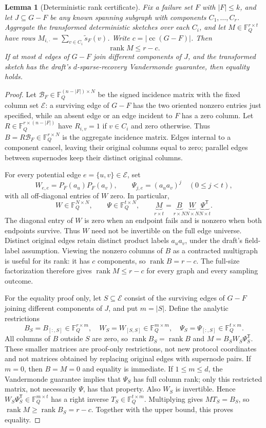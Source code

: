 \documentclass[11pt]{article}
\newtheorem{lemma}[theorem]{Lemma}
\theoremstyle{remark}\newtheorem{remark}[theorem]{Remark}
\newcommand{\F}{\mathbb F}
\newcommand{\rank}{\operatorname{rank}}
\newcommand{\cc}{\operatorname{cc}}
\begin{document}
\begin{lemma}[Deterministic rank certificate]\label{lem:rank}
Fix a failure set $F$ with $|F|\le k$, and let $J\subseteq G-F$ be any known spanning subgraph with components $C_1,\ldots,C_r$. Aggregate the transformed deterministic sketches over each $C_i$, and let $M\in\F_Q^{r\times t}$ have rows $M_{i,\cdot}=\sum_{v\in C_i}\widetilde s_F(v)$. Write $c=|\cc(G-F)|$. Then
\[
 \rank M\le r-c.
\]
If at most $d$ edges of $G-F$ join different components of $J$, and the transformed sketch has the draft's $d$-sparse-recovery Vandermonde guarantee, then equality holds.
\end{lemma}
\begin{proof}
Let $\mathcal B_F\in\F_Q^{(n-|F|)\times N}$ be the signed incidence matrix with the fixed column set $\mathcal E$: a surviving edge of $G-F$ has the two oriented nonzero entries just specified, while an absent edge or an edge incident to $F$ has a zero column. Let $R\in\F_Q^{r\times(n-|F|)}$ have $R_{i,v}=1$ if $v\in C_i$ and zero otherwise. Thus $B=R\mathcal B_F\in\F_Q^{r\times N}$ is the aggregate incidence matrix. Edges internal to a component cancel, leaving their original columns equal to zero; parallel edges between supernodes keep their distinct original columns.

For every potential edge $e=\{u,v\}\in\mathcal E$, set
\[
 W_{e,e}=P_F(a_u)P_F(a_v),\qquad
 \Psi_{j,e}=(a_ua_v)^j\quad(0\le j<t),
\]
with all off-diagonal entries of $W$ zero. In particular,
\[
 W\in\F_Q^{N\times N},\qquad
 \Psi\in\F_Q^{t\times N},\qquad
 \underbrace{M}_{r\times t}
 =\underbrace{B}_{r\times N}
  \underbrace{W}_{N\times N}
  \underbrace{\Psi^{\mathsf T}}_{N\times t}.
\]
The diagonal entry of $W$ is zero when an endpoint fails and is nonzero when both endpoints survive. Thus $W$ need not be invertible on the full edge universe. Distinct original edges retain distinct product labels $a_ua_v$, under the draft's field-label assumption. Viewing the nonzero columns of $B$ as a contracted multigraph is useful for its rank: it has $c$ components, so $\rank B=r-c$. The full-size factorization therefore gives $\rank M\le r-c$ for every graph and every sampling outcome.

For the equality proof only, let $S\subseteq\mathcal E$ consist of the surviving edges of $G-F$ joining different components of $J$, and put $m=|S|$. Define the analytic restrictions
\[
 B_S=B_{[:,S]}\in\F_Q^{r\times m},\quad
 W_S=W_{[S,S]}\in\F_Q^{m\times m},\quad
 \Psi_S=\Psi_{[:,S]}\in\F_Q^{t\times m}.
\]
All columns of $B$ outside $S$ are zero, so $\rank B_S=\rank B$ and $M=B_SW_S\Psi_S^{\mathsf T}$. These smaller matrices are proof-only restrictions, not new protocol coordinates and not matrices obtained by replacing original edges with supernode pairs. If $m=0$, then $B=M=0$ and equality is immediate. If $1\le m\le d$, the Vandermonde guarantee implies that $\Psi_S$ has full column rank; only this restricted matrix, not necessarily $\Psi$, has that property. Also $W_S$ is invertible. Hence $W_S\Psi_S^{\mathsf T}\in\F_Q^{m\times t}$ has a right inverse $T_S\in\F_Q^{t\times m}$. Multiplying gives $MT_S=B_S$, so $\rank M\ge\rank B_S=r-c$. Together with the upper bound, this proves equality.
\end{proof}
\end{document}
